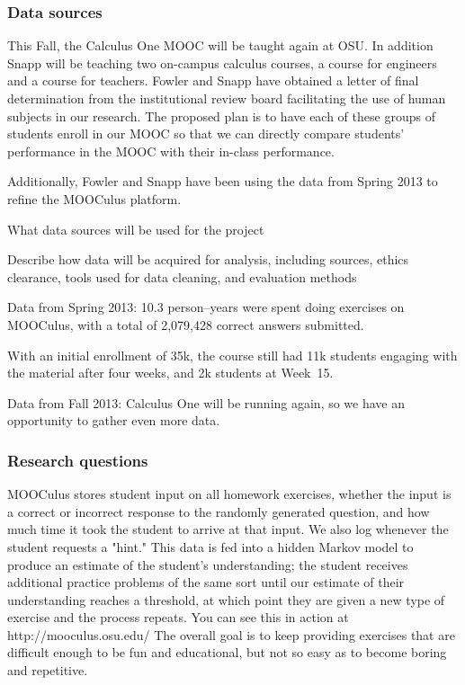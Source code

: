\documentclass[12pt]{article}
\begin{document}
\subsubsection*{Data sources}




This Fall, the Calculus One MOOC will be taught again at OSU.  In
addition Snapp will be teaching two on-campus calculus courses, a
course for engineers and a course for teachers.  Fowler and Snapp have
obtained a letter of final determination from the institutional review
board facilitating the use of human subjects in our research. The
proposed plan is to have each of these groups of students enroll in
our MOOC so that we can directly compare students' performance in the
MOOC with their in-class performance.




Additionally, Fowler and Snapp have been using the data from Spring
2013 to refine the MOOCulus platform.



What data sources will be used for the project

Describe how data will be acquired for analysis, including sources,
ethics clearance, tools used for data cleaning, and evaluation
methods

Data from Spring 2013: 10.3 person--years were spent doing exercises
on MOOCulus, with a total of 2,079,428 correct answers submitted.

With an initial enrollment of 35k, the course still had 11k students
engaging with the material after four weeks, and 2k students at
Week~15.

Data from Fall 2013: Calculus One will be running again, so we have an
opportunity to gather even more data.

\subsubsection*{Research questions}

MOOCulus stores student input on all homework exercises, whether the
input is a correct or incorrect response to the randomly generated
question, and how much time it took the student to arrive at that
input.  We also log whenever the student requests a "hint."  This data
is fed into a hidden Markov model to produce an estimate of the
student's understanding; the student receives additional practice
problems of the same sort until our estimate of their understanding
reaches a threshold, at which point they are given a new type of
exercise and the process repeats.  You can see this in action at
http://mooculus.osu.edu/ The overall goal is to keep providing
exercises that are difficult enough to be fun and educational, but not
so easy as to become boring and repetitive.
\end{document}
